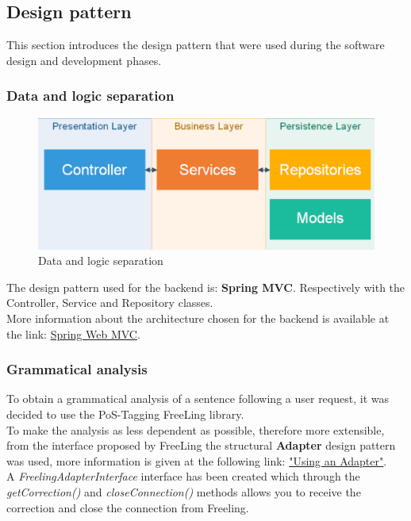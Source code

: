 \subsection{Design pattern}
This section introduces the design pattern that were used during the software design and development phases. 
\subsubsection{Data and logic separation}
\begin{figure}[H]
\centering 
\includegraphics[scale=0.3]{uml/backendArchitecture.png} 
\caption{Data and logic separation}
\end{figure}

The design pattern used for the backend is: \textbf{Spring MVC}.
Respectively with the Controller, Service and Repository classes.
\\ 
More information about the architecture chosen for the backend is available at the link: \href{https://docs.spring.io/spring/docs/current/spring-framework-reference/web.html}{Spring Web MVC}.

\subsubsection{Grammatical analysis}
To obtain a grammatical analysis of a sentence following a user request, it was decided to use the PoS-Tagging FreeLing library.\\
To make the analysis as less dependent as possible, therefore more extensible, from the interface proposed by FreeLing the structural \textbf{Adapter} design pattern was used, more information is given at the following link: \href{https://www.martinfowler.com/bliki/RequiredInterface.html}{"Using an Adapter"}.\\
A \textit{FreelingAdapterInterface} interface has been created which through the \textit{getCorrection()} and \textit{closeConnection()} methods allows you to receive the correction and close the connection from Freeling. 

